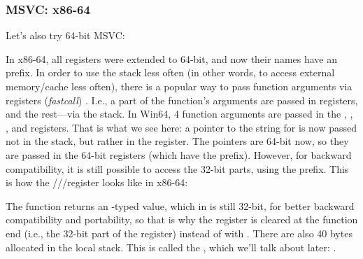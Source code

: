 \subsubsection{MSVC: x86-64}

Let's also try 64-bit MSVC:




In x86-64, all registers were extended to 64-bit, and now their names have an  prefix.
In order to use the stack less often (in other words, to access external memory/cache less often), there is
a popular way to pass function arguments via registers (\emph{fastcall}) .
I.e., a part of the function's arguments are passed in registers, and the rest---via the stack.
In Win64, 4 function arguments are passed in the \RCX, \RDX, , and  registers.
That is what we see here: a pointer to the string for \printf is now passed not in the stack, but rather in the \RCX register.
The pointers are 64-bit now, so they are passed in the 64-bit registers (which have the  prefix).
However, for backward compatibility, it is still possible to access the 32-bit parts, using the  prefix.
This is how the \RAX/\EAX/\AX/\AL register looks like in x86-64:


The \main function returns an \Tint{}-typed value, which in \CCpp is still 32-bit, for better backward compatibility
and portability, so that is why the \EAX register is cleared at the function end (i.e., the 32-bit
part of the register) instead of with \RAX{}.
There are also 40 bytes allocated in the local stack.
This is called the , which we'll talk about later: .
